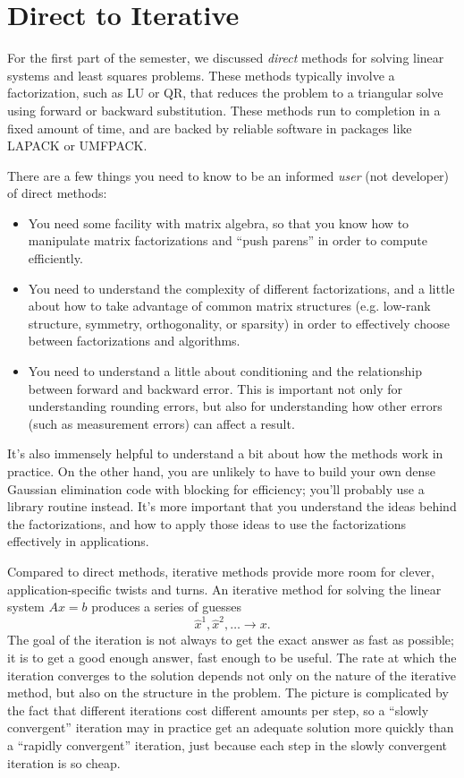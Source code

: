 \documentclass[12pt, leqno]{article}
\begin{document}

\section*{Direct to Iterative}

For the first part of the semester, we discussed {\em direct} methods for
solving linear systems and least squares problems.  These methods
typically involve a factorization, such as LU or QR, that reduces the
problem to a triangular solve using forward or backward substitution.
These methods run to completion in a fixed amount of time, and are
backed by reliable software in packages like LAPACK or UMFPACK.

There are a few things you need to know to be an informed {\em user}
(not developer) of direct methods:
\begin{itemize}
\item
  You need some facility with matrix algebra, so that you know how to
  manipulate matrix factorizations and ``push parens'' in order to
  compute efficiently.
\item
  You need to understand the complexity of different factorizations,
  and a little about how to take advantage of common matrix structures
  (e.g. low-rank structure, symmetry, orthogonality, or sparsity) in
  order to effectively choose between factorizations and algorithms.
\item
  You need to understand a little about conditioning and the
  relationship between forward and backward error.  This is important
  not only for understanding rounding errors, but also for
  understanding how other errors (such as measurement errors) can
  affect a result.
\end{itemize}
It's also immensely helpful to understand a bit about how the methods
work in practice.  On the other hand, you are unlikely to have to
build your own dense Gaussian elimination code with blocking for
efficiency; you'll probably use a library routine instead.  It's more
important that you understand the ideas behind the factorizations, and
how to apply those ideas to use the factorizations effectively in
applications.

Compared to direct methods, iterative methods provide more room for
clever, application-specific twists and turns.  An iterative method
for solving the linear system $Ax = b$ produces a series of guesses
\[
  \hat{x}^1, \hat{x}^2, \ldots \rightarrow x.
\]
The goal of the iteration is not always to get the exact answer as
fast as possible; it is to get a good enough answer, fast enough to be
useful.  The rate at which the iteration converges to the solution
depends not only on the nature of the iterative method, but also on
the structure in the problem.  The picture is complicated by the fact
that different iterations cost different amounts per step, so a
``slowly convergent'' iteration may in practice get an adequate
solution more quickly than a ``rapidly convergent'' iteration, just
because each step in the slowly convergent iteration is so cheap.
\end{document}
